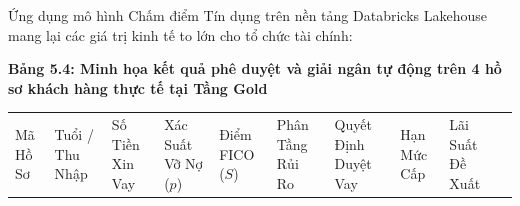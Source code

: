 \documentclass[
  13pt,
  a4paper,
]{report}
\newcounter{none} %
\begin{document}
Ứng dụng mô hình Chấm điểm Tín dụng trên nền tảng Databricks Lakehouse
mang lại các giá trị kinh tế to lớn cho tổ chức tài chính:

\textbf{Bảng 5.4: Minh họa kết quả phê duyệt và giải ngân tự động trên 4
hồ sơ khách hàng thực tế tại Tầng Gold}

{\def\LTcaptype{none} %
\begin{longtable}[]{@{}
  >{\centering\arraybackslash}p{}
  >{\centering\arraybackslash}p{}
  >{\centering\arraybackslash}p{}
  >{\centering\arraybackslash}p{}
  >{\centering\arraybackslash}p{}
  >{\raggedright\arraybackslash}p{}
  >{\raggedright\arraybackslash}p{}
  >{\centering\arraybackslash}p{}
  >{\centering\arraybackslash}p{}
  >{\raggedright\arraybackslash}p{}@{}}
\toprule\noalign{}
\begin{minipage}[b]{\linewidth}\centering
Mã Hồ Sơ
\end{minipage} & \begin{minipage}[b]{\linewidth}\centering
Tuổi / Thu Nhập
\end{minipage} & \begin{minipage}[b]{\linewidth}\centering
Số Tiền Xin Vay
\end{minipage} & \begin{minipage}[b]{\linewidth}\centering
Xác Suất Vỡ Nợ (\(p\))
\end{minipage} & \begin{minipage}[b]{\linewidth}\centering
Điểm FICO (\(S\))
\end{minipage} & \begin{minipage}[b]{\linewidth}\raggedright
Phân Tầng Rủi Ro
\end{minipage} & \begin{minipage}[b]{\linewidth}\raggedright
Quyết Định Duyệt Vay
\end{minipage} & \begin{minipage}[b]{\linewidth}\centering
Hạn Mức Cấp
\end{minipage} & \begin{minipage}[b]{\linewidth}\centering
Lãi Suất Đề Xuất
\end{minipage} & \begin{minipage}[b]{\linewidth}\raggedright

\end{minipage}
\end{longtable}}
\end{document}
